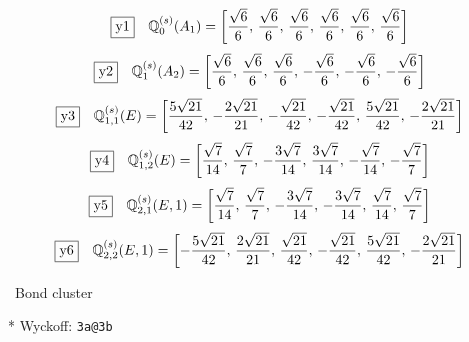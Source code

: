 \documentclass[fleqn,10pt,landscape]{jsarticle}
\begin{document}
\begin{dmath*}
\fbox{y1}\quad \mathbb{Q}_{0}^{(s)}(A_{1})=\left[ \frac{\sqrt{6}}{6},\, \frac{\sqrt{6}}{6},\, \frac{\sqrt{6}}{6},\, \frac{\sqrt{6}}{6},\, \frac{\sqrt{6}}{6},\, \frac{\sqrt{6}}{6} \right]
\end{dmath*}
\begin{dmath*}
\fbox{y2}\quad \mathbb{Q}_{1}^{(s)}(A_{2})=\left[ \frac{\sqrt{6}}{6},\, \frac{\sqrt{6}}{6},\, \frac{\sqrt{6}}{6},\, - \frac{\sqrt{6}}{6},\, - \frac{\sqrt{6}}{6},\, - \frac{\sqrt{6}}{6} \right]
\end{dmath*}
\begin{dmath*}
\fbox{y3}\quad \mathbb{Q}_{1,1}^{(s)}(E)=\left[ \frac{5 \sqrt{21}}{42},\, - \frac{2 \sqrt{21}}{21},\, - \frac{\sqrt{21}}{42},\, - \frac{\sqrt{21}}{42},\, \frac{5 \sqrt{21}}{42},\, - \frac{2 \sqrt{21}}{21} \right]
\end{dmath*}
\begin{dmath*}
\fbox{y4}\quad \mathbb{Q}_{1,2}^{(s)}(E)=\left[ \frac{\sqrt{7}}{14},\, \frac{\sqrt{7}}{7},\, - \frac{3 \sqrt{7}}{14},\, \frac{3 \sqrt{7}}{14},\, - \frac{\sqrt{7}}{14},\, - \frac{\sqrt{7}}{7} \right]
\end{dmath*}
\begin{dmath*}
\fbox{y5}\quad \mathbb{Q}_{2,1}^{(s)}(E,1)=\left[ \frac{\sqrt{7}}{14},\, \frac{\sqrt{7}}{7},\, - \frac{3 \sqrt{7}}{14},\, - \frac{3 \sqrt{7}}{14},\, \frac{\sqrt{7}}{14},\, \frac{\sqrt{7}}{7} \right]
\end{dmath*}
\begin{dmath*}
\fbox{y6}\quad \mathbb{Q}_{2,2}^{(s)}(E,1)=\left[ - \frac{5 \sqrt{21}}{42},\, \frac{2 \sqrt{21}}{21},\, \frac{\sqrt{21}}{42},\, - \frac{\sqrt{21}}{42},\, \frac{5 \sqrt{21}}{42},\, - \frac{2 \sqrt{21}}{21} \right]
\end{dmath*}
\vspace{5mm}

\noindent\textbullet\, Bond cluster

\vspace{5mm}

\noindent ** Wyckoff: \texttt{3a@3b}
\end{document}
